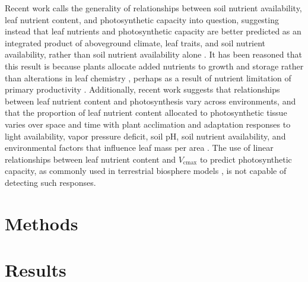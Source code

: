    Recent work calls the generality of relationships between soil nutrient availability, leaf nutrient content, and photosynthetic capacity into question, suggesting instead that leaf nutrients and photosynthetic capacity are better predicted as an integrated product of aboveground climate, leaf traits, and soil nutrient availability, rather than soil nutrient availability alone . It has been reasoned that this result is because plants allocate added nutrients to growth and storage rather than alterations in leaf chemistry , perhaps as a result of nutrient limitation of primary productivity . Additionally, recent work suggests that relationships between leaf nutrient content and photosynthesis vary across environments, and that the proportion of leaf nutrient content allocated to photosynthetic tissue varies over space and time with plant acclimation and adaptation responses to light availability, vapor pressure deficit, soil pH, soil nutrient availability, and environmental factors that influence leaf mass per area . The use of linear relationships between leaf nutrient content and $V_{\mathrm{cmax}}$ to predict photosynthetic capacity, as commonly used in terrestrial biosphere models , is not capable of detecting such responses.


    \section{Methods}
    
    \section{Results}